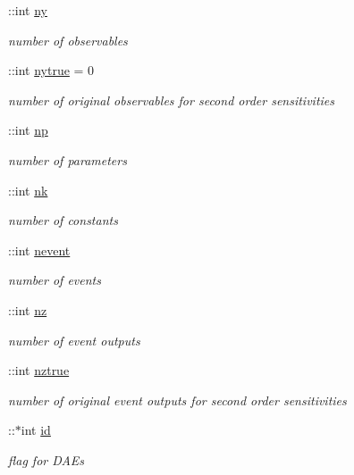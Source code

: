 \begin{DoxyCompactItemize}
\+::int \hyperlink{classamimodel_a289ca425eb368f1d582b6be2be0d3dfc}{ny}
\begin{DoxyCompactList}\small\item\em number of observables \end{DoxyCompactList}\item 
\+::int \hyperlink{classamimodel_ac91d7b36031ec122abc9f739692b02e8}{nytrue} = 0
\begin{DoxyCompactList}\small\item\em number of original observables for second order sensitivities \end{DoxyCompactList}\item 
\+::int \hyperlink{classamimodel_a6f6e2fe71b05c4c2f2d967ce9ca02dfd}{np}
\begin{DoxyCompactList}\small\item\em number of parameters \end{DoxyCompactList}\item 
\+::int \hyperlink{classamimodel_afd6bea572754e0c3c320664bdccf0200}{nk}
\begin{DoxyCompactList}\small\item\em number of constants \end{DoxyCompactList}\item 
\+::int \hyperlink{classamimodel_aab5c7f06273122b68624eb3bca6a9b6e}{nevent}
\begin{DoxyCompactList}\small\item\em number of events \end{DoxyCompactList}\item 
\+::int \hyperlink{classamimodel_a79f11413e5bfe18a0e71e17574399ad5}{nz}
\begin{DoxyCompactList}\small\item\em number of event outputs \end{DoxyCompactList}\item 
\+::int \hyperlink{classamimodel_a364ecd990baeeefd1de3e6795cd50a58}{nztrue}
\begin{DoxyCompactList}\small\item\em number of original event outputs for second order sensitivities \end{DoxyCompactList}\item 
\+::$\ast$int \hyperlink{classamimodel_acf2488b95c97e0378c9bf49de3b50f28}{id}
\begin{DoxyCompactList}\small\item\em flag for D\+A\+Es \end{DoxyCompactList}\item 

\end{DoxyCompactItemize}
